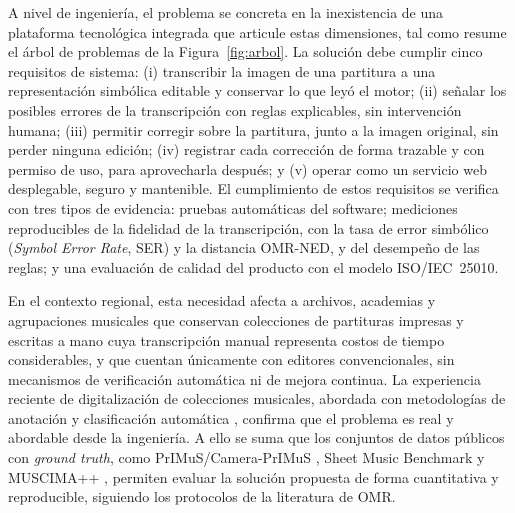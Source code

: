 \documentclass[conference]{IEEEtran}
\begin{document}
A nivel de ingeniería, el problema se concreta en la inexistencia de una
plataforma tecnológica integrada que articule estas dimensiones, tal como
resume el árbol de problemas de la Figura~\ref{fig:arbol}. La
solución debe cumplir cinco requisitos de sistema: (i) transcribir la
imagen de una partitura a una representación simbólica editable y
conservar lo que leyó el motor; (ii) señalar los posibles errores de la
transcripción con reglas explicables, sin intervención humana; (iii)
permitir corregir sobre la partitura, junto a la imagen original, sin
perder ninguna edición; (iv) registrar cada corrección de forma trazable y
con permiso de uso, para aprovecharla después; y (v) operar como un
servicio web desplegable, seguro y mantenible. El cumplimiento de estos
requisitos se verifica con tres tipos de evidencia: pruebas automáticas
del software; mediciones reproducibles de la fidelidad de la
transcripción, con la tasa de error simbólico (\emph{Symbol Error Rate},
SER) y la distancia OMR-NED, y del desempeño de las reglas; y una
evaluación de calidad del producto con el modelo ISO/IEC~25010.

En el contexto regional, esta necesidad afecta a archivos, academias y
agrupaciones musicales que conservan colecciones de partituras impresas y
escritas a mano cuya transcripción manual representa costos de tiempo
considerables, y que cuentan únicamente con editores convencionales, sin
mecanismos de verificación automática ni de mejora continua. La
experiencia reciente de digitalización de colecciones musicales,
abordada con metodologías de anotación y clasificación automática
\cite{ricordi2024}, confirma que el problema es real y abordable desde la
ingeniería. A ello se suma que los conjuntos de datos públicos con
\emph{ground truth}, como PrIMuS/Camera-PrIMuS
\cite{calvo2018,cameraprimus2018}, Sheet
Music Benchmark \cite{smb2025} y MUSCIMA++ \cite{muscima2017}, permiten
evaluar la solución propuesta de forma cuantitativa y reproducible,
siguiendo los protocolos de la literatura de OMR.
\end{document}
